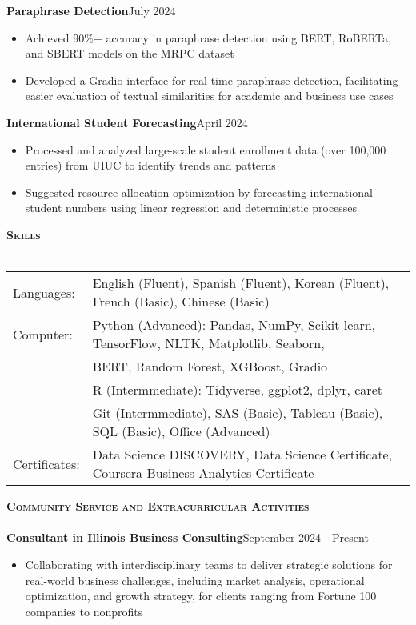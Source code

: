 \documentclass[a4paper]{article}
\newcommand{\lineunder} {
    \vspace*{-8pt} \\
    \hspace*{-18pt} \hrulefill \\
}
\newcommand{\header} [1] {
    {\hspace*{-18pt}\vspace*{6pt} \textsc{#1}}
    \vspace*{-6pt} \lineunder
}
\begin{document}
\textbf{Paraphrase Detection}\hfill{July 2024}\\
\begin{itemize}[nolistsep]
    \item Achieved 90\%+ accuracy in paraphrase detection using BERT, RoBERTa,
     and SBERT models on the MRPC dataset
    \item Developed a Gradio interface for real-time paraphrase detection, facilitating easier evaluation 
    of textual similarities for academic and business use cases
\end{itemize}

\textbf{International Student Forecasting}\hfill{April 2024}\\
\begin{itemize}[nolistsep]
    \item Processed and analyzed large-scale student enrollment data 
    (over 100,000 entries) from UIUC to identify trends and patterns
    \item Suggested resource allocation optimization by forecasting 
    international student numbers using linear regression and deterministic processes
    \end{itemize}



\vspace*{1mm}

\header{\textbf{Skills}}
\begin{tabular}{ l l }
    Languages: & English (Fluent), Spanish (Fluent), Korean (Fluent), French (Basic), Chinese (Basic)              \\
    Computer: & Python (Advanced): Pandas, NumPy, Scikit-learn, TensorFlow, 
    NLTK, Matplotlib, Seaborn, \\
    & BERT, Random Forest, XGBoost, Gradio\\
    & R (Intermmediate): Tidyverse, ggplot2, dplyr, caret\\
    & Git (Intermmediate), SAS (Basic), Tableau (Basic), SQL (Basic), Office (Advanced)\\
    Certificates: & Data Science DISCOVERY, Data Science Certificate, 
    Coursera Business Analytics Certificate
\end{tabular}


\vspace{1mm}


\header{\textbf{Community Service and Extracurricular Activities}}

\textbf{Consultant in Illinois Business Consulting}\hfill September 2024 - Present\\
\begin{itemize}[nolistsep]
    \item Collaborating with interdisciplinary teams to deliver strategic solutions 
    for real-world business challenges, including market analysis, 
    operational optimization, and growth strategy, for clients ranging from Fortune 
    100 companies to nonprofits
\end{itemize} 
\end{document}
